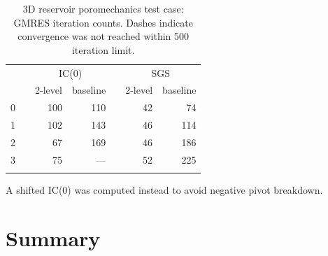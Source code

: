 \begin{table}
    \centering
    \caption{3D reservoir poromechanics test case: GMRES iteration counts.   Dashes indicate convergence was not reached within 500 iteration limit.}
    \label{tab:mazumodel2_matlab_conv_poro}
    \let\TPToverlap=\TPTrlap
    \begin{threeparttable}[t]
    \begin{tabular}{rrrrrrr}
        \hline\noalign{\smallskip}
        \multirow{2}{*}{$\ell$} & & \multicolumn{2}{c}{IC(0)} & & \multicolumn{2}{c}{SGS} \\
        \noalign{\smallskip}\cline{3-4} \cline{6-7}\noalign{\smallskip}
        & & 2-level & baseline & & 2-level & baseline \\
        \hline\noalign{\smallskip}
        0 & & 100 & 110 & & 42 &  74 \\
        1 & & 102 & 143 & & 46 & 114 \\
        2 & &  67 & 169 & & 46 & 186 \\
        3 & &  75\tnote{\textsuperscript{\textdagger}} & ---\tnote{\textsuperscript{\textdagger}} & & 52 & 225 \\
        \hline\noalign{\smallskip}
    \end{tabular}
    \begin{tablenotes}
        \item [\textsuperscript{\textdagger}] A shifted IC(0) was computed instead to avoid negative pivot breakdown.
    \end{tablenotes}
    \end{threeparttable}
\end{table}



\section{Summary}
\label{sec:msrsb_summary}

